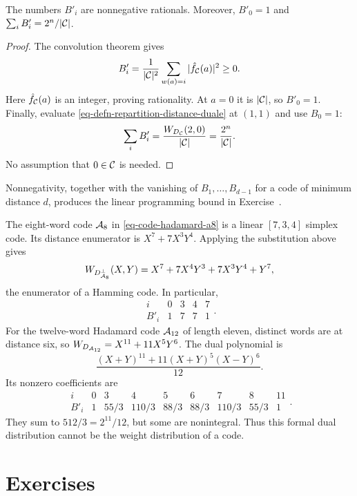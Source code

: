 \begin{prop}
\label{prop-positivite-repartition-duale}
The numbers $B'_i$ are nonnegative rationals. Moreover,
$B'_0=1$ and $\sum_i B'_i=2^n/|\mathcal{C}|$.
\end{prop}
\begin{proof}
The convolution theorem gives
\[
 B'_i=\frac1{|\mathcal{C}|^2}\sum_{w(a)=i}|\hat{f}_{\mathcal{C}}(a)|^2\geq0.
\]
Here $\hat{f}_{\mathcal{C}}(a)$ is an integer, proving rationality. At $a=0$ it
is $|\mathcal{C}|$, so $B'_0=1$. Finally, evaluate
\eqref{eq-defn-repartition-distance-duale} at $(1,1)$ and use $B_0=1$:
\[
 \sum_i B'_i=\frac{W_{D_{\mathcal{C}}}(2,0)}{|\mathcal{C}|}=
             \frac{2^n}{|\mathcal{C}|}.
\]
No assumption that $0\in\mathcal{C}$ is needed.
\end{proof}
Nonnegativity, together with the vanishing of $B_1,\ldots,B_{d-1}$ for
a code of minimum distance $d$, produces the linear programming bound
in Exercise~.


\begin{exmp}
The eight-word code $\mathcal{A}_8$ in \eqref{eq-code-hadamard-a8} is a linear
$[7,3,4]$ simplex code. Its distance enumerator is $X^7+7X^3Y^4$.
Applying the substitution above gives
\[
 W_{D_{\mathcal{A}_8}^\bot}(X,Y)=X^7+7X^4Y^3+7X^3Y^4+Y^7,
\]
the enumerator of a Hamming code. In particular,
\[
 \begin{array}{c|rrrr}i&0&3&4&7\\\hline B'_i&1&7&7&1\end{array}.
\]
For the twelve-word Hadamard code $\mathcal{A}_{12}$ of length eleven, distinct
words are at distance six, so $W_{D_{\mathcal{A}_{12}}}=X^{11}+11X^5Y^6$.
The dual polynomial is
\[
 \frac{(X+Y)^{11}+11(X+Y)^5(X-Y)^6}{12}.
\]
Its nonzero coefficients are
\[
 \begin{array}{c|rrrrrrrr}
 i&0&3&4&5&6&7&8&11\\\hline
 B'_i&1&55/3&110/3&88/3&88/3&110/3&55/3&1
 \end{array}.
\]
They sum to $512/3=2^{11}/12$, but some are nonintegral. Thus this
formal dual distribution cannot be the weight distribution of a code.
\end{exmp}

\section{Exercises}
\label{sect1-trans-fourier-val-finite-field-exercises}

